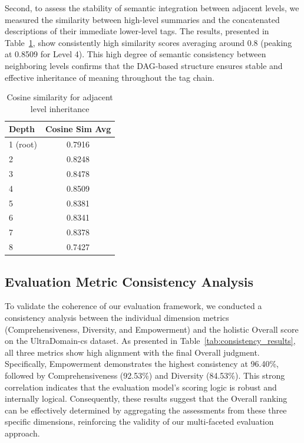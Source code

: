 \documentclass[11pt]{article}
\begin{document}
Second, to assess the stability of semantic integration between adjacent levels, we measured the similarity between high-level summaries and the concatenated descriptions of their immediate lower-level tags. The results, presented in Table~\ref{tab:adjacent_similarity}, show consistently high similarity scores averaging around 0.8 (peaking at 0.8509 for Level 4). This high degree of semantic consistency between neighboring levels confirms that the DAG-based structure ensures stable and effective inheritance of meaning throughout the tag chain.

\begin{table}[h]
\centering
\begin{tabular}{lc}
\toprule
Depth & Cosine Sim Avg \\
\midrule
1 (root) & 0.7916 \\
2 & 0.8248 \\
3 & 0.8478 \\
4 & 0.8509 \\
5 & 0.8381 \\
6 & 0.8341 \\
7 & 0.8378 \\
8 & 0.7427 \\
\bottomrule
\end{tabular}
\caption{Cosine similarity for adjacent level inheritance}
\label{tab:adjacent_similarity}
\end{table}






\subsection{Evaluation Metric Consistency Analysis}

To validate the coherence of our evaluation framework, we conducted a consistency analysis between the individual dimension metrics (Comprehensiveness, Diversity, and Empowerment) and the holistic Overall score on the UltraDomain-cs dataset. As presented in Table~\ref{tab:consistency_results}, all three metrics show high alignment with the final Overall judgment. Specifically, Empowerment demonstrates the highest consistency at 96.40\%, followed by Comprehensiveness (92.53\%) and Diversity (84.53\%). This strong correlation indicates that the evaluation model's scoring logic is robust and internally logical. Consequently, these results suggest that the Overall ranking can be effectively determined by aggregating the assessments from these three specific dimensions, reinforcing the validity of our multi-faceted evaluation approach.
\end{document}
